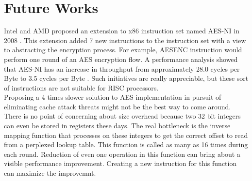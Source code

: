 \section{Future Works}

Intel and AMD proposed an extension to x86 instruction set named AES-NI in 2008 \citep{aesni}. This extension added 7 new instructions to the instruction set with a view to abstracting the encryption process. For example, AESENC instruction would perform one round of an AES encryption flow. A performance analysis showed that AES-NI has an increase in throughput from approximately 28.0 cycles per Byte to 3.5 cycles per Byte \citep{aesni}. Such initiatives are really appreciable, but these sort of instructions are not suitable for RISC processors.\\

Proposing a 4 times slower solution to AES implementation in pursuit of eliminating cache attack threats might not be the best way to come around. There is no point of concerning about size overhead because two 32 bit integers can even be stored in registers these days. The real bottleneck is the inverse mapping function that processes on these integers to get the correct offset to read from a perplexed lookup table. This function is called as many as 16 times during each round. Reduction of even one operation in this function can bring about a visible performance improvement. Creating a new instruction for this function can maximize the improvemnt.\\
